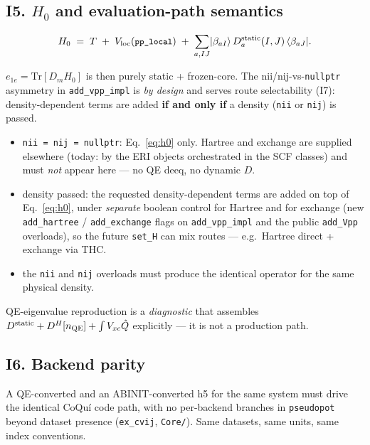 \documentclass[11pt]{article}
\newcommand{\ket}[1]{\lvert #1 \rangle}
\newcommand{\bra}[1]{\langle #1 \rvert}
\newcommand{\code}[1]{\texttt{\small #1}}
\newcommand{\Dstat}{D^{\mathrm{static}}}
\newcommand{\Qhat}{\hat{Q}}
\begin{document}
\subsection*{I5. $H_0$ and evaluation-path semantics}

\begin{keybox}
\begin{equation}
H_0 \;=\; T \;+\; V_{\rm loc}(\text{\code{pp\_local}})
\;+\; \sum_{a,IJ} \ket{\beta_{aI}}\, \Dstat_{a}(I,J)\, \bra{\beta_{aJ}} .
\label{eq:h0}
\end{equation}
\end{keybox}
$e_{1e} = \mathrm{Tr}[D_m H_0]$ is then purely static + frozen-core.
The nii/nij-vs-\code{nullptr} asymmetry in \code{add\_vpp\_impl} is
\emph{by design} and serves route selectability (I7): density-dependent
terms are added \textbf{if and only if} a density (\code{nii} or
\code{nij}) is passed.
\begin{itemize}[leftmargin=1.6em]
\item \code{nii = nij = nullptr}: Eq.~\eqref{eq:h0} only. Hartree and
exchange are supplied elsewhere (today: by the ERI objects orchestrated in
the SCF classes) and must \emph{not} appear here --- no QE deeq, no dynamic
$D$.
\item density passed: the requested density-dependent terms are added on
top of Eq.~\eqref{eq:h0}, under \emph{separate} boolean control for Hartree
and for exchange (new \code{add\_hartree} / \code{add\_exchange} flags on
\code{add\_vpp\_impl} and the public \code{add\_Vpp} overloads), so the
future \code{set\_H} can mix routes --- e.g.\ Hartree direct + exchange via
THC.
\item the \code{nii} and \code{nij} overloads must produce the identical
operator for the same physical density.
\end{itemize}
QE-eigenvalue reproduction is a \emph{diagnostic} that assembles
$\Dstat + D^H[n_{\rm QE}] + \int V_{xc}\Qhat$ explicitly --- it is not a
production path.

\subsection*{I6. Backend parity}

A QE-converted and an ABINIT-converted h5 for the same system must drive the
identical CoQu\'i code path, with no per-backend branches in
\code{pseudopot} beyond dataset presence (\code{ex\_cvij}, \code{Core/}).
Same datasets, same units, same index conventions.
\end{document}
